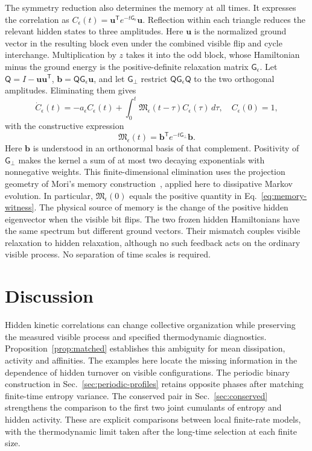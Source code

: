 \documentclass[aps,pre,reprint,amsmath,amssymb,longbibliography,floatfix]{revtex4-2}
\begin{document}
The symmetry reduction also determines the memory at all times.
It expresses the correlation as
$C_\epsilon(t)=\boldsymbol u^{\mathsf T}e^{-t\mathsf G_\epsilon}\boldsymbol u$. Reflection within each triangle reduces the relevant hidden states
to three amplitudes. Here $\boldsymbol u$ is the normalized ground
vector in the resulting block even under the combined visible flip
and cycle interchange.
Multiplication by $z$ takes it into the odd block, whose Hamiltonian
minus the ground energy is the positive-definite relaxation matrix
$\mathsf G_\epsilon$. Let
$\mathsf Q=I-\boldsymbol u\boldsymbol u^{\mathsf T}$,
$\boldsymbol b=\mathsf Q\mathsf G_\epsilon\boldsymbol u$, and let
$\mathsf G_\perp$ restrict $\mathsf Q\mathsf G_\epsilon\mathsf Q$ to the
two orthogonal amplitudes. Eliminating them gives
\begin{equation}
 \dot C_\epsilon(t)=-a_\epsilon C_\epsilon(t)
 +\int_0^t\mathfrak M_\epsilon(t-\tau)C_\epsilon(\tau)\,d\tau,
 \quad C_\epsilon(0)=1,
 \label{eq:memory-main-kernel}
\end{equation}
with the constructive expression
\begin{equation}
 \mathfrak M_\epsilon(t)=
 \boldsymbol b^{\mathsf T}e^{-t\mathsf G_\perp}\boldsymbol b.
 \label{eq:memory-kernel-main}
\end{equation}
Here $\boldsymbol b$ is understood in an orthonormal basis of that
complement. Positivity of $\mathsf G_\perp$ makes the kernel a sum of at
most two decaying exponentials with nonnegative weights. This finite-dimensional elimination uses the projection geometry of
Mori's memory construction~\cite{Mori1965}, applied here to dissipative
Markov evolution. In particular,
$\mathfrak M_\epsilon(0)$ equals the positive quantity in
Eq.~\eqref{eq:memory-witness}. The physical source of memory is the
change of the positive hidden eigenvector when the visible bit flips.
The two frozen hidden Hamiltonians have the same spectrum but different
ground vectors. Their mismatch couples visible relaxation to hidden
relaxation, although no such feedback acts on the ordinary visible
process. No separation of time scales is required.

\section{Discussion}
\label{sec:discussion}

Hidden kinetic correlations can change collective organization while
preserving the measured visible process and specified thermodynamic
diagnostics. Proposition~\ref{prop:matched} establishes this ambiguity
for mean dissipation, activity and affinities. The examples here locate the missing information
in the dependence of hidden turnover on visible configurations. The periodic binary construction in Sec.~\ref{sec:periodic-profiles}
retains opposite phases after matching finite-time entropy variance.
The conserved pair in Sec.~\ref{sec:conserved} strengthens the comparison
to the first two joint cumulants of entropy and hidden activity. These are explicit comparisons between local
finite-rate models, with the thermodynamic limit taken after the
long-time selection at each finite size.
\end{document}
